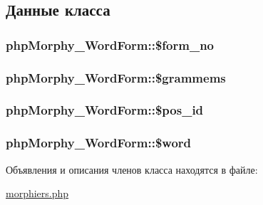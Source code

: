 \subsection{Данные класса}
\hypertarget{classphpMorphy__WordForm_aed67270b07f37f3504624fe0720f7db3}{
\subsubsection[{\$form\_\-no}]{\setlength{\rightskip}{0pt plus 5cm}phpMorphy\_\-WordForm::\$form\_\-no}}
\label{classphpMorphy__WordForm_aed67270b07f37f3504624fe0720f7db3}
\hypertarget{classphpMorphy__WordForm_a483e03c07f1eb2235af107a2bb4859c0}{
\subsubsection[{\$grammems}]{\setlength{\rightskip}{0pt plus 5cm}phpMorphy\_\-WordForm::\$grammems}}
\label{classphpMorphy__WordForm_a483e03c07f1eb2235af107a2bb4859c0}
\hypertarget{classphpMorphy__WordForm_a7049695bc8eb986924eb9ad3e2d00e84}{
\subsubsection[{\$pos\_\-id}]{\setlength{\rightskip}{0pt plus 5cm}phpMorphy\_\-WordForm::\$pos\_\-id}}
\label{classphpMorphy__WordForm_a7049695bc8eb986924eb9ad3e2d00e84}
\hypertarget{classphpMorphy__WordForm_a514dcba8300120d8f21cc571738e2347}{
\subsubsection[{\$word}]{\setlength{\rightskip}{0pt plus 5cm}phpMorphy\_\-WordForm::\$word}}
\label{classphpMorphy__WordForm_a514dcba8300120d8f21cc571738e2347}


Объявления и описания членов класса находятся в файле:\begin{DoxyCompactItemize}
\item 
\hyperlink{morphiers_8php}{morphiers.php}\end{DoxyCompactItemize}
